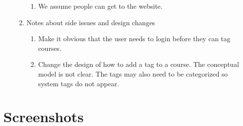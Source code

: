 \documentclass[12pt]{report}
\begin{document}
\begin{enumerate}
\begin{enumerate}
\begin{enumerate}
        \item We assume people can get to the website. 
        \end{enumerate}
    \item Notes about side issues and design changes
        \begin{enumerate}
        \item  Make it obvious that the user needs to login before they can tag courses.
        \item Change the design of how to add a tag to a course. The conceptual model is not clear. The tags may also need to be categorized so system tags do not appear. 
        \end{enumerate}
    \end{enumerate}
\end{enumerate}


\section{Screenshots}
\end{document}
